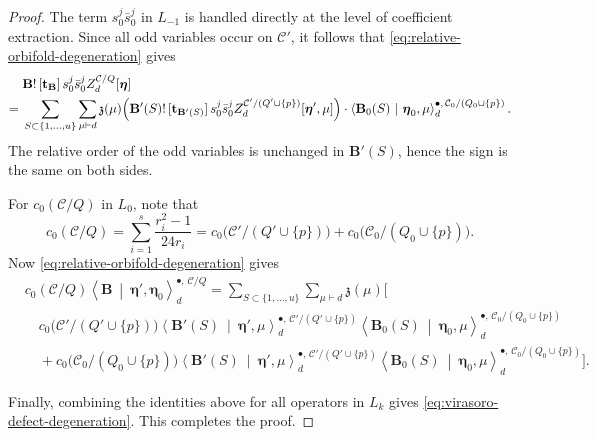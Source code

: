 \documentclass[letterpaper,12pt]{amsart}
\theoremstyle{definition}
\newcommand{\PP}{\mathbb P}
\newcommand{\cC}{\mathcal C}
\newcommand{\OrbCap}{\mathrm{Cap}}
\numberwithin{equation}{section}
\begin{document}
\begin{proof}
The term \(s^j_0\bar s^j_0\) in \(L_{-1}\) is handled directly at the
level of coefficient extraction.  Since all odd
variables occur on \(\cC'\), it follows that \eqref{eq:relative-orbifold-degeneration} gives
\[
\begin{aligned}
&\mathbf B!\,[\mathbf t_{\mathbf B}]\,s^j_0\bar s^j_0
 Z_d^{\cC/Q}[\boldsymbol\eta]
\\
={}&\sum_{S\subset\{1,\ldots,u\}}\sum_{\mu\vdash d}\mathfrak z(\mu)
 \Bigl(\mathbf B'(S)!\,[\mathbf t_{\mathbf B'(S)}]\,s^j_0\bar s^j_0
 Z_d^{\cC'/(Q'\cup\{p\})}[\boldsymbol\eta',\mu]\Bigr)\cdot
 \left\langle\mathbf B_0(S)\ \middle|\ \boldsymbol\eta_0,\mu\right\rangle_d^{\bullet,\,\cC_0/(Q_0\cup\{p\})}.
\end{aligned}
\]
The relative order of the odd variables is unchanged in
\(\mathbf B'(S)\),
hence the sign is the same on both sides.



For $c_0(\cC/Q)$ in $L_0$, note that
\[
c_0(\cC/Q)
=\sum_{i=1}^{s}\frac{r_i^2-1}{24r_i}
=c_0\bigl(\cC'/(Q'\cup\{p\})\bigr)
+c_0\bigl(\cC_0/(Q_0\cup\{p\})\bigr).
\]
Now  \eqref{eq:relative-orbifold-degeneration} gives
\[
\begin{aligned}
&c_0(\cC/Q)
 \left\langle\mathbf B\ \middle|\ \boldsymbol\eta',\boldsymbol\eta_0
 \right\rangle_d^{\bullet,\,\cC/Q}
={}\sum_{S\subset\{1,\ldots,u\}}\sum_{\mu\vdash d}\mathfrak z(\mu)\Bigg[
\\[-2mm]
&\quad c_0\bigl(\cC'/(Q'\cup\{p\})\bigr)
 \left\langle\mathbf B'(S)\ \middle|\ \boldsymbol\eta',\mu\right\rangle_d^{\bullet,\,\cC'/(Q'\cup\{p\})}
 \left\langle\mathbf B_0(S)\ \middle|\ \boldsymbol\eta_0,\mu\right\rangle_d^{\bullet,\,\cC_0/(Q_0\cup\{p\})}
\\[-1mm]
&\quad+c_0\bigl(\cC_0/(Q_0\cup\{p\})\bigr)
 \left\langle\mathbf B'(S)\ \middle|\ \boldsymbol\eta',\mu\right\rangle_d^{\bullet,\,\cC'/(Q'\cup\{p\})}
 \left\langle\mathbf B_0(S)\ \middle|\ \boldsymbol\eta_0,\mu\right\rangle_d^{\bullet,\,\cC_0/(Q_0\cup\{p\})}\Bigg].
\end{aligned}
\]


Finally, combining the identities above for all operators in \(L_k\) gives
\eqref{eq:virasoro-defect-degeneration}. This completes the proof.
\end{proof}

\end{document}

